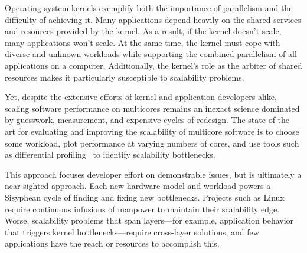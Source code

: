 Operating system kernels exemplify both the importance
of parallelism and the difficulty of achieving it.
%
Many applications depend heavily on the shared services and resources
provided by the kernel.
%
As a result, if the kernel doesn't scale, many applications won't
scale.
%
At the same time, the kernel must cope with diverse and unknown
workloads while supporting the combined parallelism of all
applications on a computer.  Additionally, the kernel's role as the
arbiter of shared resources makes it particularly susceptible to
scalability problems.
%
%

Yet, despite the extensive efforts of kernel and application
developers alike, scaling software performance on multicores remains
an inexact science dominated by guesswork, measurement, and expensive
cycles of redesign.
%
The state of the art for evaluating and improving the scalability of
multicore software is to choose some workload, plot performance at
varying numbers of cores, and use tools such as differential
profiling~\cite{mckenney:differential} to identify scalability
bottlenecks.
%

This approach focuses developer effort on demonstrable issues, but is
ultimately a near-sighted approach.
%
%
Each new hardware model and workload powers a Sisyphean cycle of
finding and fixing new bottlenecks.
%
Projects such as Linux require continuous infusions of manpower to
maintain their scalability edge.
%
Worse, scalability problems that span layers---for example,
application behavior that triggers kernel bottlenecks---require
cross-layer solutions, and few applications have the reach or
resources to accomplish this.

